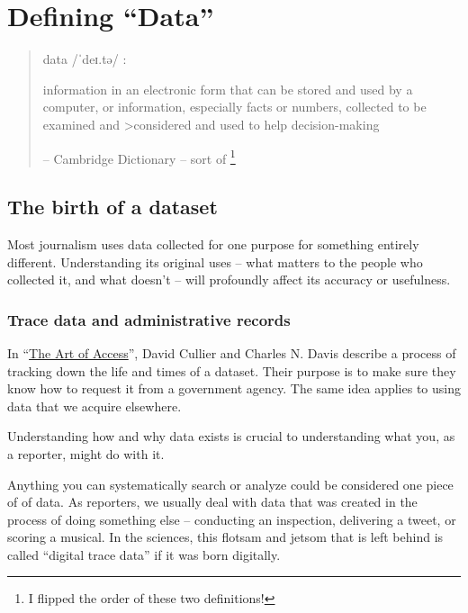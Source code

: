 \documentclass[
  letterpaper,
  DIV=11,
  numbers=noendperiod]{scrreprt}
\begin{document}

\hypertarget{start-data-def}{%
\chapter{Defining ``Data''}\label{start-data-def}}

\begin{quote}
data /ˈdeɪ.tə/ :

information in an electronic form that can be stored and used by a
computer, or information, especially facts or numbers, collected to be
examined and \textgreater considered and used to help decision-making

-- Cambridge Dictionary -- sort of \footnote{I flipped the order of
  these two definitions!}
\end{quote}

\hypertarget{the-birth-of-a-dataset}{%
\section{The birth of a dataset}\label{the-birth-of-a-dataset}}

Most journalism uses data collected for one purpose for something
entirely different. Understanding its original uses -- what matters to
the people who collected it, and what doesn't -- will profoundly affect
its accuracy or usefulness.

\hypertarget{trace-data-and-administrative-records}{%
\subsection*{Trace data and administrative
records}\label{trace-data-and-administrative-records}}

In
``\href{https://www.amazon.com/Art-Access-Strategies-Acquiring-Records/dp/1604265507}{The
Art of Access}'', David Cullier and Charles N. Davis describe a process
of tracking down the life and times of a dataset. Their purpose is to
make sure they know how to request it from a government agency. The same
idea applies to using data that we acquire elsewhere.

Understanding how and why data exists is crucial to understanding what
you, as a reporter, might do with it.

Anything you can systematically search or analyze could be considered
one piece of of data. As reporters, we usually deal with data that was
created in the process of doing something else -- conducting an
inspection, delivering a tweet, or scoring a musical. In the sciences,
this flotsam and jetsom that is left behind is called ``digital trace
data'' if it was born digitally.
\end{document}
